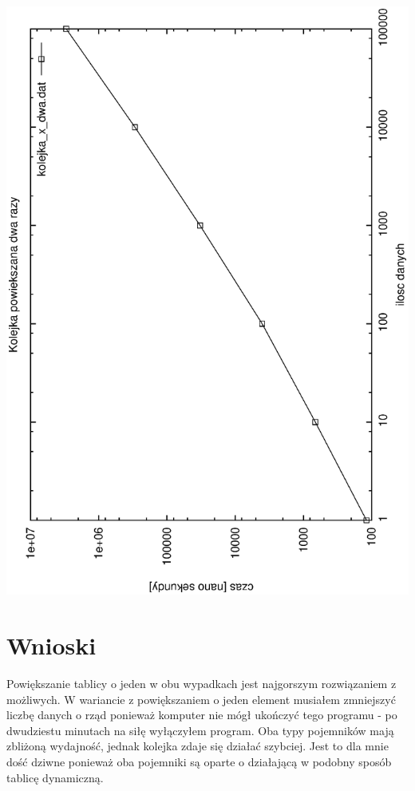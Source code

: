 \documentclass[a4paper,11pt]{report}
\begin{document}
\newline
\includegraphics[scale=0.55, angle=270]{wykresy/kolejka_x_dwa.eps}


\chapter{Wnioski}
Powiększanie tablicy o jeden w obu wypadkach jest najgorszym rozwiązaniem z możliwych. W wariancie z powiększaniem o jeden element musiałem zmniejszyć liczbę danych o rząd ponieważ komputer nie mógł ukończyć tego programu - po dwudziestu minutach na siłę wyłączyłem program.
Oba typy pojemników mają zbliżoną wydajność, jednak kolejka zdaje się działać szybciej. Jest to dla mnie dość dziwne ponieważ oba pojemniki są oparte o działającą w podobny sposób tablicę dynamiczną.
\end{document}
